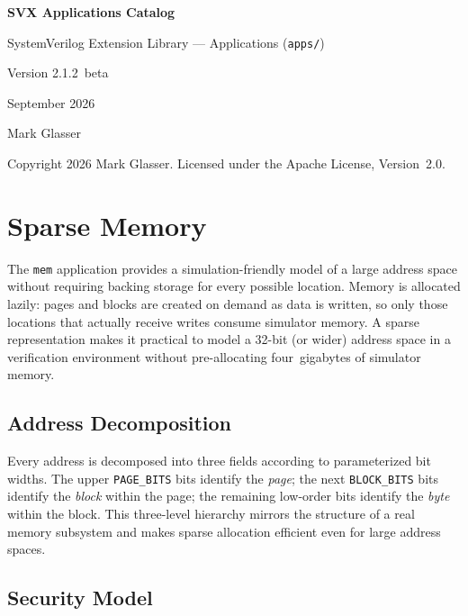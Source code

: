 \documentclass[11pt,letterpaper]{report}
\begin{document}
\begin{titlepage}
\vspace*{2cm}
{\Huge\bfseries SVX Applications Catalog\par}
\vspace{0.5cm}
{\large SystemVerilog Extension Library --- Applications (\texttt{apps/})\par}
\vspace{1cm}
{\large Version 2.1.2~beta\par}
\vspace{0.3cm}
{\large September 2026\par}
\vspace{0.3cm}
{\large Mark Glasser\par}
\vspace{1cm}
{\small Copyright 2026 Mark Glasser.
Licensed under the Apache License, Version~2.0.\par}
\end{titlepage}

\tableofcontents
\newpage
\chapter{Sparse Memory}


The \texttt{mem} application provides a simulation-friendly model of a large
address space without requiring backing storage for every possible location.
Memory is allocated lazily: pages and blocks are created on demand as data
is written, so only those locations that actually receive writes consume
simulator memory.  A sparse representation makes it practical to model a
32-bit (or wider) address space in a verification environment without
pre-allocating four~gigabytes of simulator memory.

\section*{Address Decomposition}

Every address is decomposed into three fields according to parameterized
bit widths.  The upper \texttt{PAGE\_BITS} bits identify the \emph{page};
the next \texttt{BLOCK\_BITS} bits identify the \emph{block} within the
page; the remaining low-order bits identify the \emph{byte} within the
block.  This three-level hierarchy mirrors the structure of a real memory
subsystem and makes sparse allocation efficient even for large address
spaces.

\section*{Security Model}
\end{document}
